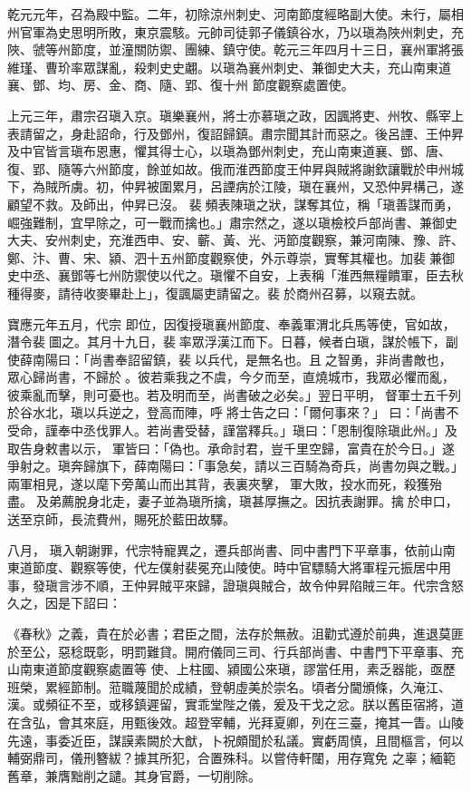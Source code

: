 \begin{pinyinscope}
 乾元元年，召為殿中監。二年，初除涼州刺史、河南節度經略副大使。未行，屬相州官軍為史思明所敗，東京震駭。元帥司徒郭子儀鎮谷水，乃以瑱為陜州刺史，充陜、虢等州節度，並潼關防禦、團練、鎮守使。乾元三年四月十三日，襄州軍將張維瑾、曹玠率眾謀亂，殺刺史史翽。以瑱為襄州刺史、兼御史大夫，充山南東道襄、鄧、均、房、金、商、隨、郢、復十州
 節度觀察處置使。



 上元三年，肅宗召瑱入京。瑱樂襄州，將士亦慕瑱之政，因諷將吏、州牧、縣宰上表請留之，身赴詔命，行及鄧州，復詔歸鎮。肅宗聞其計而惡之。後呂諲、王仲昇及中官皆言瑱布恩惠，懼其得士心，以瑱為鄧州刺史，充山南東道襄、鄧、唐、復、郢、隨等六州節度，餘並如故。俄而淮西節度王仲昇與賊將謝欽讓戰於申州城下，為賊所虜。初，仲昇被圍累月，呂諲病於江陵，瑱在襄州，又恐仲昇構己，遂顧望不救。及師出，仲昇已沒。
 裴頻表陳瑱之狀，謀奪其位，稱「瑱善謀而勇，崛強難制，宜早除之，可一戰而擒也。」肅宗然之，遂以瑱檢校戶部尚書、兼御史大夫、安州刺史，充淮西申、安、蘄、黃、光、沔節度觀察，兼河南陳、豫、許、鄭、汴、曹、宋、潁、泗十五州節度觀察使，外示尊崇，實奪其權也。加裴兼御史中丞、襄鄧等七州防禦使以代之。瑱懼不自安，上表稱「淮西無糧饋軍，臣去秋種得麥，請待收麥畢赴上」，復諷屬吏請留之。裴於商州召募，以窺去就。



 寶應元年五月，代宗
 即位，因復授瑱襄州節度、奉義軍渭北兵馬等使，官如故，潛令裴圖之。其月十九日，裴率眾浮漢江而下。日暮，候者白瑱，謀於帳下，副使薛南陽曰：「尚書奉詔留鎮，裴以兵代，是無名也。且之智勇，非尚書敵也，眾心歸尚書，不歸於。彼若乘我之不虞，今夕而至，直燒城市，我眾必懼而亂，彼乘亂而擊，則可憂也。若及明而至，尚書破之必矣。」翌日平明，督軍士五千列於谷水北，瑱以兵逆之，登高而陣，呼將士告之曰：「爾何事來？」
 曰：「尚書不受命，謹奉中丞伐罪人。若尚書受替，謹當釋兵。」瑱曰：「恩制復除瑱此州。」及取告身敕書以示，軍皆曰：「偽也。承命討君，豈千里空歸，富貴在於今日。」遂爭射之。瑱奔歸旗下，薛南陽曰：「事急矣，請以三百騎為奇兵，尚書勿與之戰。」兩軍相見，遂以麾下旁萬山而出其背，表裏夾擊，軍大敗，投水而死，殺獲殆盡。及弟薦脫身北走，妻子並為瑱所擒，瑱甚厚撫之。因抗表謝罪。擒於申口，送至京師，長流費州，賜死於藍田故驛。



 八月，
 瑱入朝謝罪，代宗特寵異之，遷兵部尚書、同中書門下平章事，依前山南東道節度、觀察等使，代左僕射裴冕充山陵使。時中官驃騎大將軍程元振居中用事，發瑱言涉不順，王仲昇賊平來歸，證瑱與賊合，故令仲昇陷賊三年。代宗含怒久之，因是下詔曰：



 《春秋》之義，貴在於必書；君臣之間，法存於無赦。沮勸式遵於前典，進退莫匪於至公，惡稔既彰，明罰難貸。開府儀同三司、行兵部尚書、中書門下平章事、充山南東道節度觀察處置等
 使、上柱國、潁國公來瑱，謬當任用，素乏器能，亟歷班榮，累經節制。蒞職蔑聞於成績，登朝虛美於崇名。頃者分閫頒條，久淹江、漢。或頻征不至，或移鎮遲留，實乖堂陛之儀，爰及干戈之忿。朕以舊臣宿將，道在含弘，會其來庭，用甄後效。超登宰輔，光拜夏卿，列在三臺，掩其一眚。山陵先遠，事委近臣，謀謨素闕於大猷，卜祝頗聞於私議。實虧周慎，且間樞言，何以輔弼鼎司，儀刑簪紱？據其所犯，合置殊科。以嘗侍軒闥，用存寬免
 之辜；緬範舊章，兼膺黜削之譴。其身官爵，一切削除。




\end{pinyinscope}
